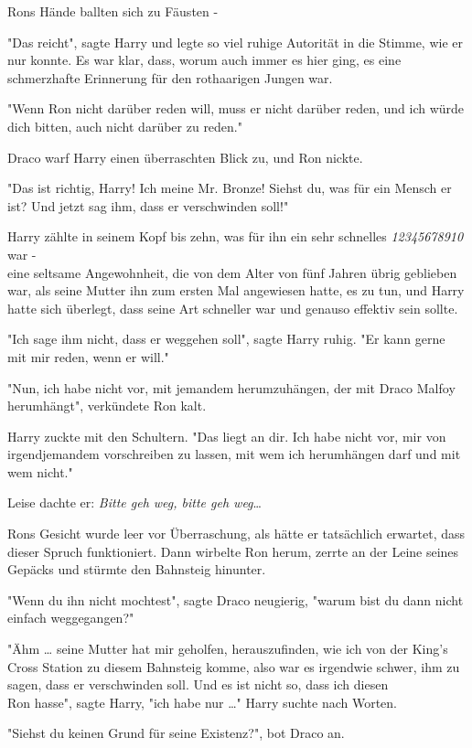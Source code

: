 {Rons Hände ballten sich zu Fäusten -

"Das reicht", sagte Harry und legte so viel ruhige Autorität in die Stimme, wie er nur konnte. Es war klar, dass, worum auch immer es hier ging, es eine schmerzhafte Erinnerung für den rothaarigen Jungen war.

"Wenn Ron nicht darüber reden will, muss er nicht darüber reden, und ich würde dich bitten, auch nicht darüber zu reden."

Draco warf Harry einen überraschten Blick zu, und Ron nickte.

"Das ist richtig, Harry! Ich meine Mr. Bronze! Siehst du, was für ein Mensch er ist? Und jetzt sag ihm, dass er verschwinden soll!"

Harry zählte in seinem Kopf bis zehn, was für ihn ein sehr schnelles \emph{12345678910} war -\\ eine seltsame Angewohnheit, die von dem Alter von fünf Jahren übrig geblieben war, als seine Mutter ihn zum ersten Mal angewiesen hatte, es zu tun, und Harry hatte sich überlegt, dass seine Art schneller war und genauso effektiv sein sollte.

"Ich sage ihm nicht, dass er weggehen soll", sagte Harry ruhig. "Er kann gerne mit mir reden, wenn er will."

"Nun, ich habe nicht vor, mit jemandem herumzuhängen, der mit Draco Malfoy herumhängt", verkündete Ron kalt.

Harry zuckte mit den Schultern. "Das liegt an dir. Ich habe nicht vor, mir von irgendjemandem vorschreiben zu lassen, mit wem ich herumhängen darf und mit wem nicht."

Leise dachte er: \emph{Bitte geh weg, bitte geh weg}…

Rons Gesicht wurde leer vor Überraschung, als hätte er tatsächlich erwartet, dass dieser Spruch funktioniert. Dann wirbelte Ron herum, zerrte an der Leine seines Gepäcks und stürmte den Bahnsteig hinunter.

"Wenn du ihn nicht mochtest", sagte Draco neugierig, "warum bist du dann nicht einfach weggegangen?"

"Ähm … seine Mutter hat mir geholfen, herauszufinden, wie ich von der King's Cross Station zu diesem Bahnsteig komme, also war es irgendwie schwer, ihm zu sagen, dass er verschwinden soll. Und es ist nicht so, dass ich diesen\\ Ron hasse", sagte Harry, "ich habe nur …" Harry suchte nach Worten.

"Siehst du keinen Grund für seine Existenz?", bot Draco an.

}
